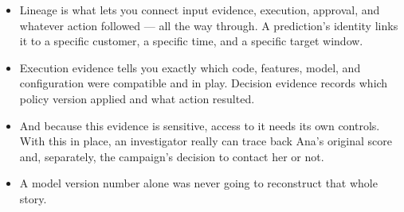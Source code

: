 \documentclass[11pt,a4paper]{article}
\begin{document}
\begin{examplebox}[title after break={SPOKEN SCRIPT --- slide 38 continued}]
\begin{itemize}
\item Lineage is what lets you connect input evidence, execution, approval, and whatever action followed — all the way through. A prediction's identity links it to a specific customer, a specific time, and a specific target window.
\item Execution evidence tells you exactly which code, features, model, and configuration were compatible and in play. Decision evidence records which policy version applied and what action resulted.
\item And because this evidence is sensitive, access to it needs its own controls. With this in place, an investigator really can trace back Ana's original score and, separately, the campaign's decision to contact her or not.
\item A model version number alone was never going to reconstruct that whole story.
\end{itemize}
\end{examplebox}
\par\noindent{\scriptsize\textcolor{teal!60!black}{Reading anchor: Bass, §14.1 · Kalinowski, §16.3–16.5 (supporting)}}
\clearpage
\end{document}
